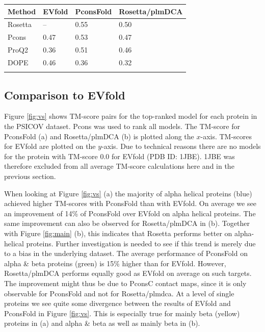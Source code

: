 \documentclass{bioinfo}
\begin{document}
\begin{table}[!t]
{\begin{tabular}{llll}\toprule
Method & EVfold & PconsFold & Rosetta/plmDCA \\ \midrule
Rosetta & -- & 0.55 & 0.50 \\
Pcons & 0.47 & 0.53 & 0.47 \\
ProQ2 & 0.36 & 0.51 & 0.46 \\
DOPE & 0.46 & 0.36 & 0.32 \\ \botrule
\end{tabular}}{}
\end{table}



\subsection{Comparison to EVfold}

Figure \ref{fig:vs} shows TM-score pairs for the top-ranked model for each protein in the PSICOV dataset. Pcons was used to rank all models. The TM-score for PconsFold (a) and Rosetta/plmDCA (b) is plotted along the $x$-axis. TM-scores for EVfold are plotted on the $y$-axis. Due to technical reasons there are no models for the protein with TM-score 0.0 for EVfold  (PDB ID: 1JBE). 1JBE was therefore excluded from all average TM-score calculations here and in the previous section.


When looking at Figure \ref{fig:vs} (a) the majority of alpha helical proteins (blue) achieved higher TM-scores with PconsFold than with EVfold. On average we see an improvement of 14\% of PconsFold over EVfold on alpha helical proteins. The same improvement can also be observed for Rosetta/plmDCA in (b). Together with Figure \ref{fig:main} (b), this indicates that Rosetta performs better on alpha-helical proteins. Further investigation is needed to see if this trend is merely due to a bias in the underlying dataset. The average performance of PconsFold on alpha \& beta proteins (green) is 15\% higher than for EVfold. However, Rosetta/plmDCA performs equally good as EVfold on average on such targets. The improvement might thus be due to PconsC contact maps, since it is only observable for PconsFold and not for Rosetta/plmdca. At a level of single proteins we see quite some divergence between the results of EVfold and PconsFold in Figure \ref{fig:vs}. This is especially true for mainly beta (yellow) proteins in (a) and alpha \& beta as well as mainly beta in (b). 
\end{document}
